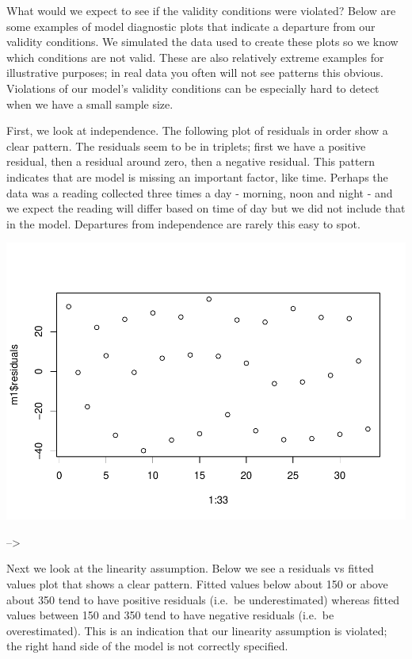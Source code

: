 \documentclass[]{book}
\begin{document}
What would we expect to see if the validity conditions were violated? Below are some examples of model diagnostic plots that indicate a departure from our validity conditions. We simulated the data used to create these plots so we know which conditions are not valid. These are also relatively extreme examples for illustrative purposes; in real data you often will not see patterns this obvious. Violations of our model's validity conditions can be especially hard to detect when we have a small sample size.

First, we look at independence. The following plot of residuals in order show a clear pattern. The residuals seem to be in triplets; first we have a positive residual, then a residual around zero, then a negative residual. This pattern indicates that are model is missing an important factor, like time. Perhaps the data was a reading collected three times a day - morning, noon and night - and we expect the reading will differ based on time of day but we did not include that in the model. Departures from independence are rarely this easy to spot.

\includegraphics{MA206supplement_files/figure-latex/unnamed-chunk-10-1.pdf}

--\textgreater{}

Next we look at the linearity assumption. Below we see a residuals vs fitted values plot that shows a clear pattern. Fitted values below about 150 or above about 350 tend to have positive residuals (i.e.~be underestimated) whereas fitted values between 150 and 350 tend to have negative residuals (i.e.~be overestimated). This is an indication that our linearity assumption is violated; the right hand side of the model is not correctly specified.
\end{document}
